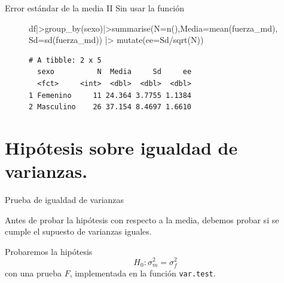 \documentclass[
  ignorenonframetext,
]{beamer}
\newenvironment{Shaded}{\begin{snugshade}}{\end{snugshade}}
\newcommand{\AttributeTok}[1]{\textcolor[rgb]{0.40,0.45,0.13}{#1}}
\newcommand{\FunctionTok}[1]{\textcolor[rgb]{0.28,0.35,0.67}{#1}}
\newcommand{\NormalTok}[1]{\textcolor[rgb]{0.00,0.23,0.31}{#1}}
\newcommand{\SpecialCharTok}[1]{\textcolor[rgb]{0.37,0.37,0.37}{#1}}
\begin{document}
\begin{frame}[fragile]{Error estándar de la media II}
\label{error-estuxe1ndar-de-la-media-ii}
Sin usar la función

\begin{figure}

\begin{Shaded}
\begin{Highlighting}[]
\NormalTok{df}\SpecialCharTok{|\textgreater{}}\FunctionTok{group\_by}\NormalTok{(sexo)}\SpecialCharTok{|\textgreater{}}\FunctionTok{summarise}\NormalTok{(}\AttributeTok{N=}\FunctionTok{n}\NormalTok{(),}\AttributeTok{Media=}\FunctionTok{mean}\NormalTok{(fuerza\_md),}\AttributeTok{Sd=}\FunctionTok{sd}\NormalTok{(fuerza\_md)) }\SpecialCharTok{|\textgreater{}} \FunctionTok{mutate}\NormalTok{(}\AttributeTok{ee=}\NormalTok{Sd}\SpecialCharTok{/}\FunctionTok{sqrt}\NormalTok{(N))   }
\end{Highlighting}
\end{Shaded}

\begin{verbatim}
# A tibble: 2 x 5
  sexo          N  Media     Sd     ee
  <fct>     <int>  <dbl>  <dbl>  <dbl>
1 Femenino     11 24.364 3.7755 1.1384
2 Masculino    26 37.154 8.4697 1.6610
\end{verbatim}

\end{figure}%
\end{frame}

\section{Hipótesis sobre igualdad de
varianzas.}\label{hipuxf3tesis-sobre-igualdad-de-varianzas.}

\begin{frame}[fragile]{Prueba de igualdad de varianzas}
\label{prueba-de-igualdad-de-varianzas}
\begin{tcolorbox}[enhanced jigsaw, colbacktitle=quarto-callout-warning-color!10!white, coltitle=black, title=\textcolor{quarto-callout-warning-color}{\faExclamationTriangle}\hspace{0.5em}{Warning}, breakable, bottomrule=.15mm, colback=white, toprule=.15mm, bottomtitle=1mm, toptitle=1mm, titlerule=0mm, rightrule=.15mm, arc=.35mm, leftrule=.75mm, colframe=quarto-callout-warning-color-frame, opacitybacktitle=0.6, left=2mm, opacityback=0]

Antes de probar la hipótesis con respecto a la media, debemos probar si
se cumple el supuesto de varianzas iguales.

\end{tcolorbox}

Probaremos la hipótesis \[H_0:\sigma^2_m=\sigma^2_f\] con una prueba
\(F\), implementada en la función \texttt{var.test}.
\end{frame}
\end{document}
